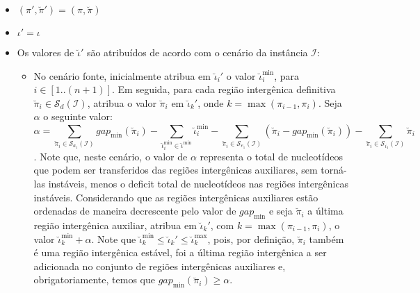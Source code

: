 \begin{itemize}
  \item $(\pi',\breve\pi') = (\pi,\breve\pi)$
  \item $\iota' = \iota$
  \item Os valores de $\breve\iota'$ são atribuídos de acordo com o cenário da instância $\mathcal{I}$:
  \begin{itemize}
    \item No cenário fonte, inicialmente atribua em $\breve\iota_{i}'$ o valor $\breve\iota^{\min}_i$, para $i \in [1..({n+1})]$. Em seguida, para cada região intergênica definitiva $\breve\pi_i \in \mathcal{S}_{d}(\mathcal{I})$, atribua o valor $\breve\pi_i$ em $\breve\iota_{k}'$, onde $k = \max(\pi_{i-1},\pi_i)$. Seja $\alpha$ o seguinte valor:
    $$\alpha = \sum_{\breve\pi_i \in \mathcal{S}_{a_{1}}(\mathcal{I})} gap_{\min}(\breve\pi_i) - \sum_{\breve\iota_{i}^{\min}  \in \breve\iota^{\min}} \breve\iota_{i}^{\min} - \sum_{\breve\pi_i \in \mathcal{S}_{e_{1}}(\mathcal{I})} (\breve\pi_i - gap_{\min}(\breve\pi_i)) - \sum_{\breve\pi_i \in \mathcal{S}_{i_{1}}(\mathcal{I})} \breve\pi_i$$.
    Note que, neste cenário, o valor de $\alpha$ representa o total de nucleotídeos que podem ser transferidos das regiões intergênicas auxiliares, sem torná-las instáveis, menos o deficit total de nucleotídeos nas regiões intergênicas instáveis. Considerando que as regiões intergênicas auxiliares estão ordenadas de maneira decrescente pelo valor de $gap_{\min}$ e seja $\breve\pi_i$ a última região intergênica auxiliar, atribua em $\breve\iota_{k}'$, com $k = \max(\pi_{i-1},\pi_i)$, o valor $\breve\iota^{\min}_k + \alpha$. Note que $\breve\iota^{\min}_k \le \breve\iota_{k}' \le \breve\iota^{\max}_k$, pois, por definição, $\breve\pi_i$ também é uma região intergênica estável, foi a última região intergênica a ser adicionada no conjunto de regiões intergênicas auxiliares e, obrigatoriamente, temos que $gap_{\min}(\breve\pi_i) \ge \alpha$.


\end{itemize}
\end{itemize}
